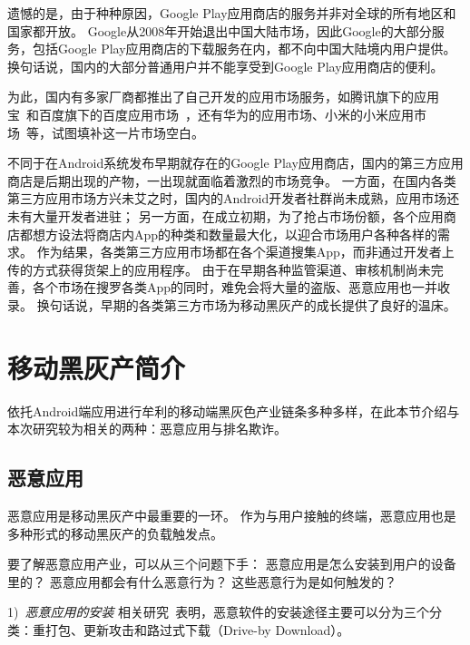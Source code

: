 遗憾的是，由于种种原因，Google Play应用商店的服务并非对全球的所有地区和国家都开放。
Google从2008年开始退出中国大陆市场，因此Google的大部分服务，包括Google Play应用商店的下载服务在内，都不向中国大陆境内用户提供。
换句话说，国内的大部分普通用户并不能享受到Google Play应用商店的便利。

为此，国内有多家厂商都推出了自己开发的应用市场服务，如腾讯旗下的应用宝~\cite{Myapp}和百度旗下的百度应用市场~\cite{Baiduappstore}，还有华为的应用市场、小米的小米应用市场~\cite{Xiaomiappstore}等，试图填补这一片市场空白。
%

不同于在Android系统发布早期就存在的Google Play应用商店，国内的第三方应用商店是后期出现的产物，一出现就面临着激烈的市场竞争。
一方面，在国内各类第三方应用市场方兴未艾之时，国内的Android开发者社群尚未成熟，应用市场还未有大量开发者进驻；
另一方面，在成立初期，为了抢占市场份额，各个应用商店都想方设法将商店内App的种类和数量最大化，以迎合市场用户各种各样的需求。
作为结果，各类第三方应用市场都在各个渠道搜集App，而非通过开发者上传的方式获得货架上的应用程序。
由于在早期各种监管渠道、审核机制尚未完善，各个市场在搜罗各类App的同时，难免会将大量的盗版、恶意应用也一并收录。
换句话说，早期的各类第三方市场为移动黑灰产的成长提供了良好的温床。

\section{移动黑灰产简介}
依托Android端应用进行牟利的移动端黑灰色产业链条多种多样，在此本节介绍与本次研究较为相关的两种：恶意应用与排名欺诈。

\subsection{恶意应用}
恶意应用是移动黑灰产中最重要的一环。
作为与用户接触的终端，恶意应用也是多种形式的移动黑灰产的负载触发点。

要了解恶意应用产业，可以从三个问题下手：
恶意应用是怎么安装到用户的设备里的？
恶意应用都会有什么恶意行为？
这些恶意行为是如何触发的？

1)\ \emph{恶意应用的安装} \quad
相关研究~\cite{Zhou2012DissectingAM}表明，恶意软件的安装途径主要可以分为三个分类：重打包、更新攻击和路过式下载（Drive-by Download）。

